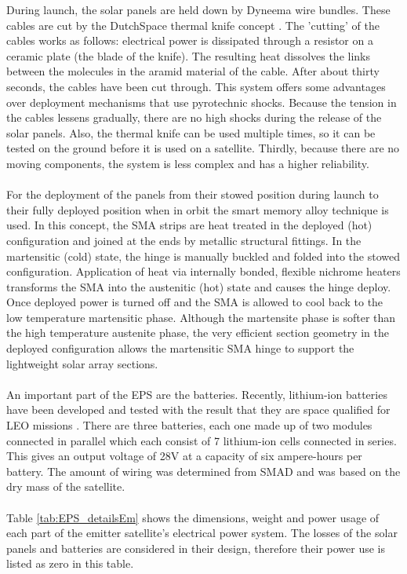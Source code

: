 During launch, the solar panels are held down by Dyneema wire bundles. These cables are cut by the DutchSpace thermal knife concept \cite{dutchspace}. The 'cutting' of the cables works as follows: electrical power is dissipated through a resistor on a ceramic plate (the blade of the knife). The resulting heat dissolves the links between the molecules in the aramid material of the cable. After about thirty seconds, the cables have been cut through. This system offers some advantages over deployment mechanisms that use pyrotechnic shocks. Because the tension in the cables lessens gradually, there are no high shocks during the release of the solar panels. Also, the thermal knife can be used multiple times, so it can be tested on the ground before it is used on a satellite. Thirdly, because there are no moving components, the system is less complex and has a higher reliability.
\\\\
For the deployment of the panels from their stowed position during launch to their fully deployed position when in orbit the smart memory alloy technique is used. In this concept, the SMA strips are heat treated in the deployed (hot) configuration and joined at the ends by metallic structural fittings. In the martensitic (cold) state, the hinge is manually buckled and folded into the stowed configuration. Application of heat via internally bonded, flexible nichrome heaters transforms the SMA into the austenitic (hot) state and causes the hinge deploy. Once deployed power is turned off and the SMA is allowed to cool back to the low temperature martensitic phase. Although the martensite phase is softer than the high temperature austenite phase, the very efficient section geometry in the deployed configuration allows the martensitic SMA hinge to support the lightweight solar array sections.
\\ \\
An important part of the EPS are the batteries. Recently, lithium-ion batteries have been developed and tested with the result that they are space qualified for LEO missions \cite{LEO_li_ion}. There are three batteries, each one made up of two modules connected in parallel which each consist of 7 lithium-ion cells connected in series. This gives an output voltage of 28V at a capacity of six ampere-hours per battery.
The amount of wiring was determined from SMAD and was based on the dry mass of the satellite.
\\ \\
Table \ref{tab:EPS_detailsEm} shows the dimensions, weight and power usage of each part of the emitter satellite's electrical power system. The losses of the solar panels and batteries are considered in their design, therefore their power use is listed as zero in this table.


